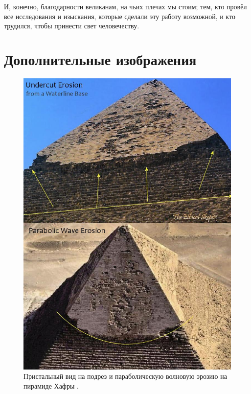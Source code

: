 \documentclass[10pt,twocolumn,letterpaper]{article}
\begin{document}
И, конечно, благодарности великанам, на чьих плечах мы стоим; тем, кто провёл все исследования и изыскания, которые сделали эту работу возможной, и кто трудился, чтобы принести свет человечеству.

\clearpage
\twocolumn

\section{Дополнительные изображения}


\begin{figure}[H]
\begin{center}
   \includegraphics[width=1\linewidth]{wave.jpg}
\end{center}
   \caption{Пристальный вид на подрез и параболическую волновую эрозию на пирамиде Хафры \cite{27}.}
\label{fig:19}
\label{fig:onecol}
\end{figure}
\end{document}
